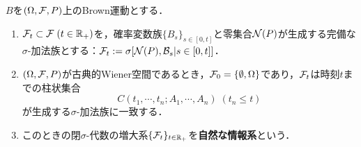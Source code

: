 \documentclass[uplatex,dvipdfmx]{jsreport}
\begin{document}
\begin{definition}
    $B$を$(\Omega,\mathcal{F},P)$上のBrown運動とする．
    \begin{enumerate}
        \item $\mathcal{F}_t\subset\mathcal{F}\;(t\in\mathbb{R}_+)$を，確率変数族$\{B_s\}_{s\in[0,t]}$と零集合$\mathcal{N}(P)$が生成する完備な$\sigma$-加法族とする：$\mathcal{F}_t:=\sigma[\mathcal{N}(P),\mathcal{B}_s|s\in[0,t]]$．
        \item $(\Omega,\mathcal{F},P)$が古典的Wiener空間であるとき，$\mathcal{F}_0=\{\emptyset,\Omega\}$であり，$\mathcal{F}_t$は時刻$t$までの柱状集合
        \[C(t_1,\cdots,t_n;A_1,\cdots,A_n)\;(t_n\le t)\]
        が生成する$\sigma$-加法族に一致する．
        \item このときの閉$\sigma$-代数の増大系$\{\mathcal{F}_t\}_{t\in\mathbb{R}_+}$を\textbf{自然な情報系}という．
    \end{enumerate}
\end{definition}
\end{document}
